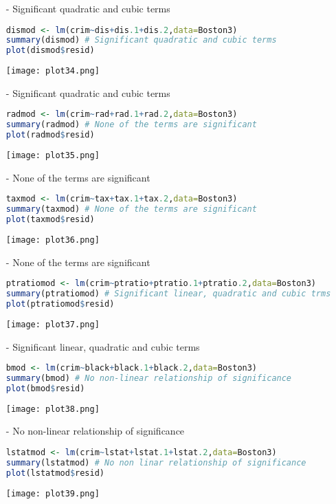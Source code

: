 \documentclass[11pt]{report}
\begin{document}
\begin{itemize}
\item[-] Significant quadratic and cubic terms


\begin{lstlisting}[language=R]
dismod <- lm(crim~dis+dis.1+dis.2,data=Boston3)
summary(dismod) # Significant quadratic and cubic terms
plot(dismod$resid)
\end{lstlisting}
\texttt{[image: plot34.png]}

\item[-] Significant quadratic and cubic terms


\begin{lstlisting}[language=R]
radmod <- lm(crim~rad+rad.1+rad.2,data=Boston3)
summary(radmod) # None of the terms are significant
plot(radmod$resid)
\end{lstlisting}
\texttt{[image: plot35.png]}

\item[-] None of the terms are significant

\begin{lstlisting}[language=R]
taxmod <- lm(crim~tax+tax.1+tax.2,data=Boston3)
summary(taxmod) # None of the terms are significant
plot(taxmod$resid)
\end{lstlisting}
\texttt{[image: plot36.png]}

\item[-] None of the terms are significant

\begin{lstlisting}[language=R]
ptratiomod <- lm(crim~ptratio+ptratio.1+ptratio.2,data=Boston3)
summary(ptratiomod) # Significant linear, quadratic and cubic trms
plot(ptratiomod$resid)
\end{lstlisting}
\texttt{[image: plot37.png]}

\item[-] Significant linear, quadratic and cubic terms

\begin{lstlisting}[language=R]
bmod <- lm(crim~black+black.1+black.2,data=Boston3)
summary(bmod) # No non-linear relationship of significance
plot(bmod$resid)
\end{lstlisting}
\texttt{[image: plot38.png]}

\item[-] No non-linear relationship of significance

\begin{lstlisting}[language=R]
lstatmod <- lm(crim~lstat+lstat.1+lstat.2,data=Boston3)
summary(lstatmod) # No non linar relationship of significance
plot(lstatmod$resid)
\end{lstlisting}
\texttt{[image: plot39.png]}


\end{itemize}
\end{document}
